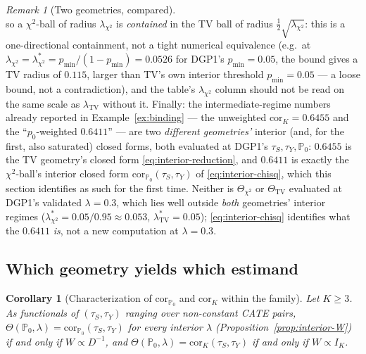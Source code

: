 \documentclass[11pt]{article}
\theoremstyle{plain}
\newtheorem{corollary}[theorem]{Corollary}
\theoremstyle{definition}
\theoremstyle{remark}
\newtheorem{remark}[theorem]{Remark}
\newcommand{\PP}{\mathbb{P}}
\newcommand{\Corr}{\mathrm{cor}}
\begin{document}
\begin{remark}[Two geometries, compared]
\[\]
so a $\chi^2$-ball of radius $\lambda_{\chi^2}$ is \emph{contained} in the TV ball of
radius $\tfrac12\sqrt{\lambda_{\chi^2}}$: this is a one-directional containment,
not a tight numerical equivalence (e.g.\ at $\lambda_{\chi^2}=\lambda^*_{\chi^2}=
p_{\min}/(1-p_{\min})=0.0526$ for DGP1's $p_{\min}=0.05$, the bound gives a TV
radius of $0.115$, larger than TV's own interior threshold $p_{\min}=0.05$ --- a
loose bound, not a contradiction), and the table's $\lambda_{\chi^2}$ column should
not be read on the same scale as $\lambda_{\mathrm{TV}}$ without it. Finally: the
intermediate-regime numbers already reported in Example~\ref{ex:binding} --- the
unweighted $\Corr_K=0.6455$ and the ``$p_0$-weighted $0.6411$'' --- are two
\emph{different geometries'} interior (and, for the first, also saturated) closed
forms, both evaluated at DGP1's $\tau_S,\tau_Y,\PP_0$: $0.6455$ is the TV
geometry's closed form \eqref{eq:interior-reduction}, and $0.6411$ is exactly the
$\chi^2$-ball's interior closed form $\Corr_{\PP_0}(\tau_S,\tau_Y)$ of
\eqref{eq:interior-chisq}, which this section identifies as such for the first
time. Neither is $\Theta_{\chi^2}$ or $\Theta_{\mathrm{TV}}$ evaluated at DGP1's
validated $\lambda=0.3$, which lies well outside \emph{both} geometries' interior
regimes ($\lambda^*_{\chi^2}=0.05/0.95\approx0.053$, $\lambda^*_{\mathrm{TV}}=0.05$);
\eqref{eq:interior-chisq} identifies what the $0.6411$ \emph{is}, not a new
computation at $\lambda=0.3$.
\end{remark}


\subsection{Which geometry yields which estimand}

\begin{corollary}[Characterization of $\Corr_{\PP_0}$ and $\Corr_K$ within the family]\label{cor:W-characterization}
Let $K\ge3$. As functionals of $(\tau_S,\tau_Y)$ ranging over non-constant CATE pairs,
$\Theta(\PP_0,\lambda)=\Corr_{\PP_0}(\tau_S,\tau_Y)$ for every interior $\lambda$
(Proposition~\ref{prop:interior-W}) if and only if $W\propto D^{-1}$, and
$\Theta(\PP_0,\lambda)=\Corr_K(\tau_S,\tau_Y)$ if and only if $W\propto I_K$.
\end{corollary}
\end{document}
